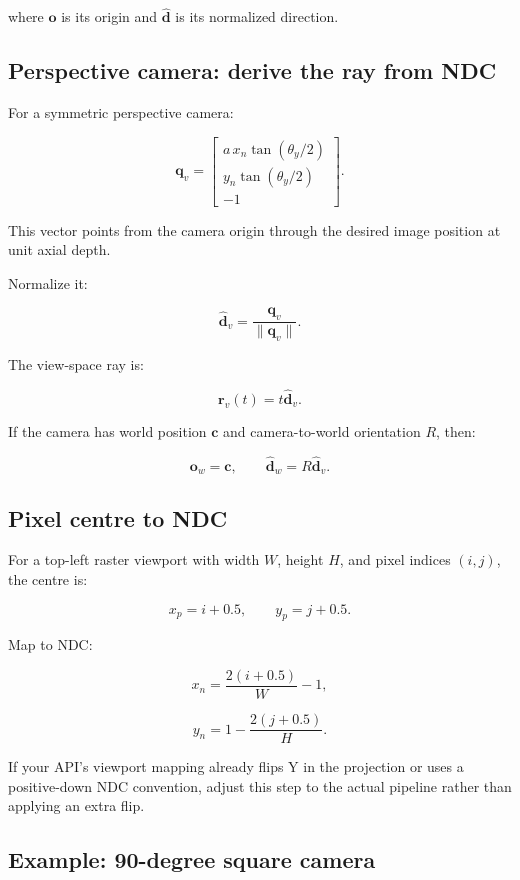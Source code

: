where \(\mathbf o\) is its origin and \(\hat{\mathbf d}\) is its normalized direction.

\subsection{Perspective camera: derive the ray from NDC}\label{02-foundations-ii-ch035-perspective-camera-derive-the-ray-from-ndc}

For a symmetric perspective camera:

\[ \mathbf q_v= \begin{bmatrix} a\,x_n\tan(\theta_y/2)\\ y_n\tan(\theta_y/2)\\ -1 \end{bmatrix}. \]

This vector points from the camera origin through the desired image position at unit axial depth.

Normalize it:

\[ \boxed{ \hat{\mathbf d}_v= \frac{\mathbf q_v}{\|\mathbf q_v\|}. } \]

The view-space ray is:

\[ \boxed{ \mathbf r_v(t)=t\hat{\mathbf d}_v. } \]

If the camera has world position \(\mathbf c\) and camera-to-world orientation \(R\), then:

\[ \boxed{ \mathbf o_w=\mathbf c, \qquad \hat{\mathbf d}_w=R\hat{\mathbf d}_v. } \]

\subsection{Pixel centre to NDC}\label{02-foundations-ii-ch035-pixel-centre-to-ndc}

For a top-left raster viewport with width \(W\), height \(H\), and pixel indices \((i,j)\), the centre is:

\[ x_p=i+0.5, \qquad y_p=j+0.5. \]

Map to NDC:

\[ \boxed{ x_n=\frac{2(i+0.5)}W-1, } \]

\[ \boxed{ y_n=1-\frac{2(j+0.5)}H. } \]

If your API's viewport mapping already flips Y in the projection or uses a positive-down NDC convention, adjust this step to the actual pipeline rather than applying an extra flip.

\subsection{Example: 90-degree square camera}\label{02-foundations-ii-ch035-example-90-degree-square-camera}

